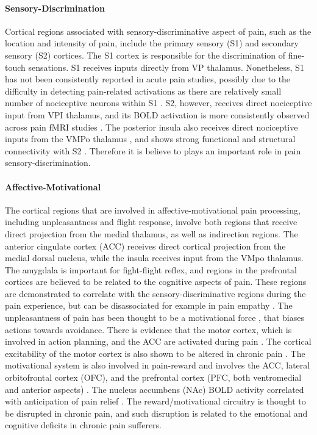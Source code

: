 \paragraph{Sensory-Discrimination}
Cortical regions associated with sensory-discriminative aspect of pain, such as the location and intensity of pain, include the primary sensory (S1) and secondary sensory (S2) cortices. The S1 cortex is responsible for the discrimination of fine-touch sensations. S1 receives inputs directly from VP thalamus. Nonetheless, S1 has not been consistently reported in acute pain studies, possibly due to the difficulty in detecting pain-related activations as there are relatively small number of nociceptive neurons within S1 \cite{bushnell1999pain}. S2, however, receives direct nociceptive input from VPI thalamus, and its BOLD activation is more consistently observed across pain fMRI studies \cite{Wager2013,Brodersen2012}. The posterior insula also receives direct nociceptive inputs from the VMPo thalamus \cite{Craig2003}, and shows strong functional and structural connectivity with S2 \cite{Wiech2014}. Therefore it is believe to plays an important role in pain sensory-discrimination. 

\paragraph{Affective-Motivational}
The cortical regions that are involved in affective-motivational pain processing, including unpleasantness and flight response, involve both regions that receive direct projection from the medial thalamus, as well as indirection regions. The anterior cingulate cortex (ACC) receives direct cortical projection from the medial dorsal nucleus, while the insula receives input from the VMpo thalamus. The amygdala is important for fight-flight reflex, and regions in the prefrontal cortices are believed to be related to the cognitive aspects of pain. These regions are demonstrated to correlate with the sensory-discriminative regions during the pain experience, but can be disassociated for example in pain empathy \cite{Singer2004}. The unpleasantness of pain has been thought to be a motivational force \cite{Auvray2010}, that biases actions towards avoidance. There is evidence that the motor cortex, which is involved in action planning, and the ACC are activated during pain \cite{Erpelding2013}. The cortical excitability of the motor cortex is also shown to be altered in chronic pain \cite{Parker2016}. The motivational system is also involved in pain-reward and involves the ACC, lateral orbitofrontal cortex (OFC), and the prefrontal cortex (PFC, both ventromedial and anterior aspects) \cite{Navratilova2015}. The nucleus accumbens (NAc) BOLD activity correlated with anticipation of pain relief \cite{Baliki2010}. The reward/motivational circuitry is thought to be disrupted in chronic pain, and such disruption is related to the emotional and cognitive deficits in chronic pain sufferers.

